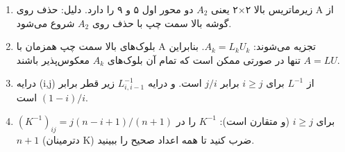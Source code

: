 \documentclass[12pt,a4paper]{article}
\begin{document}
{\begin{enumerate}
			\item زیرماتریس بالا ۲×۲ یعنی $A_2$ دو محور اول ۵ و ۹ را دارد. دلیل: حذف روی A از گوشه بالا سمت چپ با حذف روی $A_2$ شروع می‌شود.
			
			\item بلوک‌های بالا سمت چپ همزمان با A تجزیه می‌شوند: $A_k = L_kU_k$. بنابراین $A=LU$ تنها در صورتی ممکن است که تمام آن بلوک‌های $A_k$ معکوس‌پذیر باشند.
			
			\item درایه (i,j) از $L^{-1}$ برای $i \ge j$ برابر $j/i$ است. و درایه $L^{-1}_{i,i-1}$ زیر قطر برابر $(1-i)/i$ است.
			
			\item $(K^{-1})_{ij} = j(n-i+1)/(n+1)$ برای $i \ge j$ (و متقارن است): $K^{-1}$ را در $n+1$ (دترمینان K) ضرب کنید تا همه اعداد صحیح را ببینید.
		\end{enumerate}
		
	}
\end{document}
